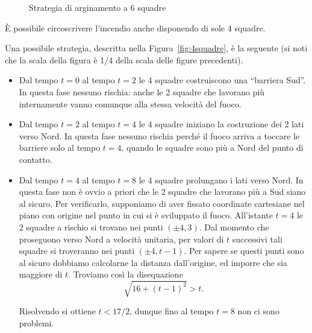 {\begin{figure}[htb]
	\caption{Strategia di arginamento a 6 squadre}
	\label{fig:6squadre}
\end{figure}

\DomandaC È possibile circoscrivere l'incendio anche disponendo di
sole 4 squadre.

Una possibile strategia, descritta nella Figura~\ref{fig:4squadre}, è la
seguente (si noti che la scala della figura è 1/4 della scala delle figure precedenti).
\begin{itemize}
	\item Dal tempo $t=0$ al tempo $t=2$ le 4 squadre costruiscono una ``barriera Sud''. In questa fase nessuno rischia: anche le 2 squadre che lavorano più internamente vanno comunque alla stessa velocità del fuoco.

	\item Dal tempo $t=2$ al tempo $t=4$ le 4 squadre iniziano la costruzione dei 2 lati verso Nord. In questa fase nessuno rischia perché il fuoco arriva a toccare le barriere solo al tempo $t=4$, quando le squadre sono più a Nord del punto di contatto.
	
	\item Dal tempo $t=4$ al tempo $t=8$ le 4 squadre prolungano i lati verso Nord.  In questa fase non è ovvio a priori che le 2 squadre che lavorano più a Sud siano al sicuro.  Per verificarlo, supponiamo di aver fissato coordinate cartesiane nel piano con origine nel punto in cui si è sviluppato il fuoco. All'istante $t=4$ le 2 squadre a rischio si trovano nei punti $(\pm 4,3)$.  Dal momento che proseguono verso Nord a velocità unitaria, per valori di $t$ successivi tali squadre si troveranno nei punti $(\pm 4,t-1)$.  Per sapere se questi punti sono al sicuro dobbiamo calcolarne la distanza dall'origine, ed imporre che sia maggiore di $t$.  Troviamo così la disequazione
	$$\sqrt{16+(t-1)^{2}}>t.$$
	
	Risolvendo si ottiene $t<17/2$, dunque fino al tempo $t=8$ non ci sono problemi.
	

\end{itemize}}
